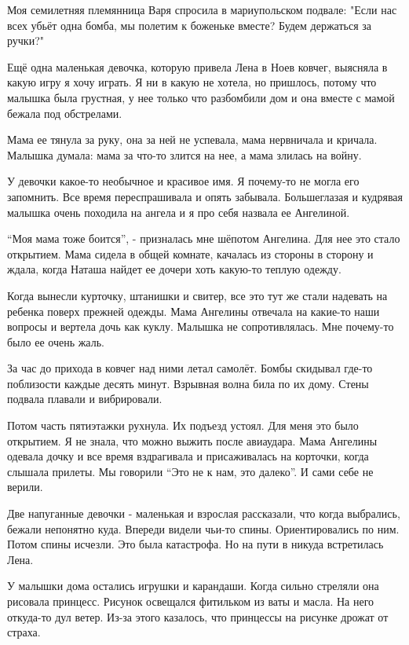Моя семилетняя племянница Варя спросила  в мариупольском  подвале: "Если нас
всех убьёт одна бомба, мы полетим к боженьке вместе? Будем держаться за ручки?"

Ещё одна маленькая девочка, которую  привела Лена в Ноев ковчег, выясняла в
какую игру я хочу играть. Я ни в какую не хотела, но пришлось, потому что
малышка была грустная, у нее  только что разбомбили дом и она вместе с мамой
бежала под обстрелами. 

Мама ее тянула за руку, она за ней не успевала, мама нервничала и кричала.
Малышка думала: мама за что-то злится на нее, а мама злилась на войну. 

У девочки  какое-то необычное и красивое имя. Я почему-то  не могла его
запомнить. Все время переспрашивала и опять забывала.  Большеглазая и кудрявая
малышка  очень походила на ангела и я про себя назвала ее Ангелиной. 

\enquote{Моя мама тоже боится}, - призналась мне шёпотом Ангелина. Для нее это стало
открытием. Мама сидела в общей комнате, качалась из стороны в сторону  и ждала,
когда Наташа найдет ее дочери хоть какую-то  теплую одежду. 

Когда вынесли курточку, штанишки и свитер, все это  тут же стали надевать на
ребенка поверх прежней одежды. Мама Ангелины отвечала на какие-то наши  вопросы
и вертела дочь как куклу. Малышка не сопротивлялась. Мне почему-то было ее
очень жаль. 

За час до прихода в ковчег  над ними летал самолёт.  Бомбы скидывал где-то
поблизости  каждые  десять минут.  Взрывная волна била по их  дому. Стены
подвала плавали и вибрировали.

Потом часть  пятиэтажки  рухнула. Их подъезд устоял. Для меня это было
открытием. Я не знала, что можно выжить после авиаудара. Мама Ангелины одевала
дочку и все время вздрагивала и  присаживалась на корточки, когда слышала
прилеты. Мы говорили \enquote{Это не к нам, это далеко}. И сами себе не верили. 

Две напуганные девочки - маленькая и взрослая  рассказали, что когда
выбрались, бежали непонятно куда. Впереди видели чьи-то спины. Ориентировались
по ним. Потом спины исчезли. Это была катастрофа. Но на пути в никуда
встретилась Лена. 

У малышки дома остались игрушки и карандаши.  Когда сильно стреляли она
рисовала принцесс. Рисунок освещался фитильком из ваты и масла.  На него
откуда-то дул ветер. Из-за этого казалось, что принцессы на  рисунке   дрожат
от страха. 

